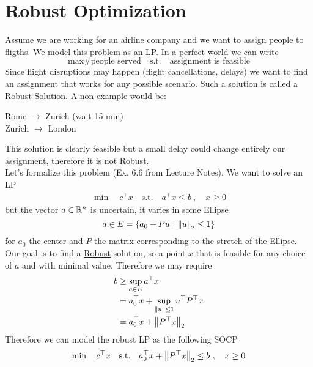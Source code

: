 \documentclass[answers]{exam}
\begin{document}
    \section{Robust Optimization}
    Assume we are working for an airline company and we want to assign people to fligths. We model this problem as an LP. In a perfect world we can write 
    $$ \max \text{\# people served} \quad\text{s.t.}\quad \text{assignment is feasible} $$
    Since flight disruptions may happen (flight cancellations, delays) we want to find an assignment that works for any possible scenario. Such a solution is called a \underline{Robust Solution}. A non-example would be:
    \begin{center}
        Rome $\to$ Zurich (wait 15 min)\\ 
        Zurich $\to$ London
    \end{center}
    This solution is clearly feasible but a small delay could change entirely our assignment, therefore it is not Robust. \\
    Let's formalize this problem (Ex. 6.6 from Lecture Notes). We want to solve an LP
    \begin{align*}
        \min\quad c^\top x \quad \text{s.t.}\quad a^\top x \leq b\ ,\quad x\geq 0
    \end{align*}
    but the vector $a\in \mathbb{R}^n$ is uncertain, it varies in some Ellipse
    $$ a\in E = \left\{a_0 + P u \ \middle|\ \left\lVert u \right\rVert_2\leq 1\right\} $$
    for $a_0$ the center and $P$ the matrix corresponding to the stretch of the Ellipse. Our goal is to find a \underline{Robust} solution, so a point $x$ that is feasible for any choice of $a$ and with minimal value. Therefore we may require
    \begin{align*}
        b &\geq \sup_{a\in E} a^\top x \\ 
        &= a_0^\top x + \sup_{\left\lVert u \right\rVert\leq 1} u^\top P^\top x \\ 
        &= a_0^\top x + \left\lVert P^\top x \right\rVert_2
    \end{align*}
    Therefore we can model the robust LP as the following SOCP 
    \begin{align*}
        \min\quad c^\top x \quad \text{s.t.}\quad a_0^\top x + \left\lVert P^\top x \right\rVert_2 \leq b\ ,\quad x\geq 0
    \end{align*}
\end{document}

